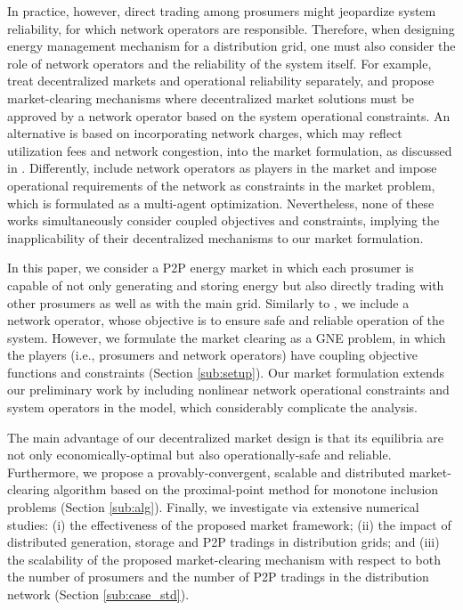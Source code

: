 \documentclass{IEEEtran}  %
\newcommand{\red}{\textcolor{red}}
\newcommand{\0}{\mathbf{0}}
\newcommand{\1}{\mathbf{1}}
\begin{document}
In practice, however, direct trading among prosumers might jeopardize system reliability, for which network operators are responsible. Therefore, when designing energy management mechanism for a distribution grid, one must also consider the role of network operators and the reliability of the system itself.
%
For example, \cite{qin2018,morstyn2019} treat decentralized markets and operational reliability separately, and propose market-clearing mechanisms where decentralized market solutions must be approved by a network operator based on the system operational constraints. 
%
An alternative is based on incorporating network charges, which may reflect utilization fees and network congestion, into the market formulation, as discussed in \cite{baroche2019b,paudel2020}. Differently, \cite{moret2020,zhang2020} include network operators as players in the market and impose operational requirements of the network as constraints in the market problem, which is formulated as a multi-agent optimization. Nevertheless, none of these works simultaneously consider coupled objectives and constraints, implying the inapplicability of their decentralized mechanisms to our market formulation.


In this paper, we consider a P2P energy market in which each prosumer is capable of not only generating and storing energy but also directly trading with other prosumers as well as with the main grid. Similarly to \cite{moret2020}, we include a network operator, whose objective is to ensure safe and reliable operation  of the system. 
%
However, we formulate the market clearing as a GNE problem, in which the players (i.e., prosumers and network operators) have coupling objective functions and constraints (Section \ref{sub:setup}). Our market formulation extends our preliminary work \cite{belgioioso2020energy} by including nonlinear network operational constraints and system operators in the model, which considerably complicate the analysis.

%
The main advantage of our decentralized market design is that its equilibria are not only economically-optimal but also operationally-safe and reliable. 
%
Furthermore, we propose a provably-convergent, scalable and distributed market-clearing algorithm based on the proximal-point method for monotone inclusion problems	\cite[\S~23]{bauschke2011convex} (Section \ref{sub:alg}). 
Finally, we investigate via extensive numerical studies: (i)  the effectiveness of the proposed market framework; (ii) the impact of distributed generation, storage and P2P tradings in distribution grids; and (iii) the scalability of the proposed market-clearing mechanism with respect to both the number of prosumers and the number of P2P tradings in the distribution network (Section \ref{sub:case_std}).
\end{document}
